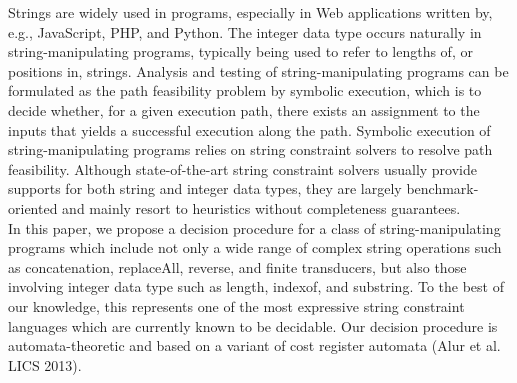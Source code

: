 
Strings are widely used in programs, especially in Web applications written by, e.g., JavaScript, PHP, and Python. The integer data type occurs naturally in string-manipulating programs, typically being used to refer to lengths of, or positions in, strings. 
Analysis and testing of string-manipulating programs can be formulated as the path feasibility problem %
by symbolic execution, which is to decide whether,  
for a given execution path, there exists an assignment to the inputs that yields a successful execution along the path. 
Symbolic execution of string-manipulating programs relies on string constraint solvers to resolve  path feasibility.
Although state-of-the-art string constraint solvers usually provide supports for both string and integer data types,   
they are largely benchmark-oriented and mainly resort to heuristics without completeness guarantees. \\ %
%
In this paper, we propose a decision procedure 
for a class of string-manipulating programs
which include  not only a wide range of complex string operations such as concatenation, replaceAll, reverse, and finite transducers, but also those involving integer data type such as length, indexof, and substring. To the best of our knowledge, this represents one of the most expressive string constraint languages which are currently known to be decidable.  Our decision procedure is automata-theoretic and based on a variant of cost register automata (Alur et al. LICS 2013). 
